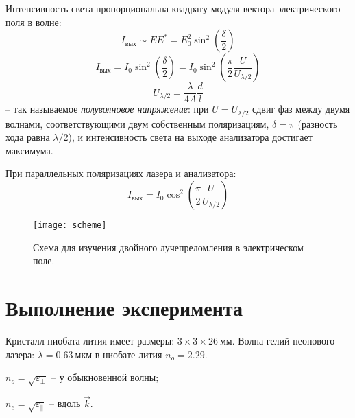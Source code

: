\documentclass{lab}
\begin{document}
Интенсивность света пропорциональна квадрату модуля вектора электрического поля в волне:
$$ I_{вых} \sim EE^* = E_0^2\sin^2\left(\frac{\delta}{2}\right) $$
\begin{equation}\label{eq_3}
I_{вых} = I_0 \sin^2\left(\frac{\delta}{2}\right) = I_0\sin^2\left(\frac{\pi}{2} \frac{U}{U_{\lambda/2}}\right)
\end{equation}
\begin{equation}\label{eq_4}
U_{\lambda/2} = \frac{\lambda}{4A}\frac{d}{l}
\end{equation}
-- так называемое \textit{полуволновое напряжение}: при $ U = U_{\lambda/2} $ сдвиг фаз между двумя волнами, соответствующими двум собственным поляризациям, $ \delta = \pi $ (разность хода равна $ \lambda/2 $), и интенсивность света на выходе анализатора достигает максимума.

При параллельных поляризациях лазера и анализатора:
\begin{equation}\label{eq_5}
I_{вых} = I_0\cos^2\left(\frac{\pi}{2}\frac{U}{U_{\lambda/2}}\right)
\end{equation}
\begin{figure}[H]
	\centering
	\texttt{[image: scheme]}
	\caption{Схема для изучения двойного лучепреломления в электрическом поле.}
	\label{scheme}
\end{figure}

\section*{Выполнение эксперимента}

Кристалл ниобата лития имеет размеры: $ 3 \times 3 \times 26~мм $. Волна гелий-неонового лазера: $ \lambda = 0.63~мкм $ в ниобате лития $ n_o = 2.29 $.

$ n_o = \sqrt{\varepsilon_{\perp}} $ -- у обыкновенной волны;

$ n_e = \sqrt{\varepsilon_{\parallel}} $ -- вдоль $ \vec{k} $.
\end{document}
